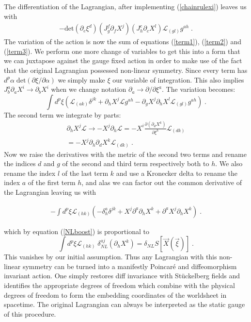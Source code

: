 \documentclass[%
 reprint,
 amsmath,amssymb,
 aps,
]{revtex4-1}
\begin{document}
The differentiation of the Lagrangian, after implementing (\ref{chainrulexi}) leaves us with
\begin{eqnarray}
\label{term3}
    - \mathrm{det} ( \partial_e \xi^d ) ( J^f_g \partial_f X^j )
    ( J^c_h \partial_{c} X^l ) \mathcal{L}_{(g l)} g^{a h} \; .
\end{eqnarray}
The variation of the action is now the sum of equations (\ref{term1}), (\ref{term2}) and (\ref{term3}).  We perform one more change
of variables to get this into a form that we can juxtapose against the gauge fixed action in order to
make use of the fact that the original Lagrangian possessed non-linear symmetry.  Since
every term has $d^p \alpha\;\mathrm{det}\left( \partial \xi/\partial \alpha\right)$ we simply make $\xi$
our variable of integration. This also implies $J^a_b \partial_a X^i \rightarrow \partial_b X^i$ when we change notation $\partial_a \rightarrow \partial/\partial \xi^a$.
The variation becomes:
\begin{equation}
\label{diffeq}
    \int d^p \xi \left(
    \mathcal{L}_{(a k)} \delta^{j k}
    + \partial_h X^j \mathcal{L} g^{a h}
    - \partial_g X^j \partial_h X^l \mathcal{L}_{(g l)} g^{a h} \right) \; .
\end{equation}
The second term we integrate by parts:
\begin{gather}
    \partial_h X^j \mathcal{L} \rightarrow
    - X^j \partial_h \mathcal{L} = - X^i \frac{\partial (\partial_d X^k)}{\partial \xi^h}
    \mathcal{L}_{(d k)} \nonumber \\
    = - X^j \partial_h \partial_d X^k \mathcal{L}_{(d k)} \; . \nonumber
\end{gather}
Now we raise the derivatives with the metric of the second two terms and rename
the indices $d$ and $g$ of the second and third term respectively both to $h$. We also
rename the index $l$ of the last term $k$ and use a Kronecker delta to rename the index
$a$ of the first term $h$, and alas we can factor out the common derivative of
the Lagrangian leaving us with
\begin{widetext}
    \begin{eqnarray}
        -\int d^p \xi \mathcal{L}_{(h k)}
        \left( - \delta^a_h \delta^{j k} + X^j \partial^a \partial_h X^k
        + \partial^a X^j \partial_h X^k \right) \; . \nonumber
    \end{eqnarray}
\end{widetext}
which by equation (\ref{NLboost}) is proportional to
\begin{equation}
    \int d^p \xi \mathcal{L}_{(h k)} \; \delta^{a j}_{NL} (\partial_h X^k)
    = \delta_{NL} S[\vec{X}(\vec{\xi})] \; .
\end{equation}
This vanishes by our initial assumption. Thus any Lagrangian with this non-linear symmetry can be turned into a
manifestly Poincar\'{e} and diffeomorphism invariant action. One simply restores diff invariance
with St\"uckelberg fields and identifies the appropriate degrees of freedom which combine with the physical
degrees of freedom to form the embedding coordinates of the worldsheet in spacetime. The original
Lagrangian can always be interpreted as the static gauge of this procedure.
\end{document}
